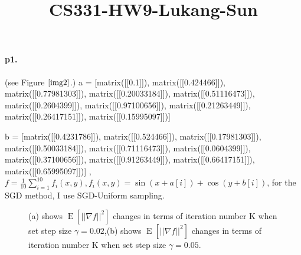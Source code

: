 \documentclass[12pt,a4paper]{article}
\title{CS331-HW9-Lukang-Sun}
\DeclareMathOperator{\E}{\mathrm{E}}
\begin{document}
	\maketitle
	\paragraph{p1.}
	(see Figure $\ref{img2}$.)
	a = [matrix([[0.1]]), matrix([[0.424466]]), matrix([[0.77981303]]), matrix([[0.20033184]]), matrix([[0.51116473]]), matrix([[0.2604399]]), matrix([[0.97100656]]), matrix([[0.21263449]]), matrix([[0.26417151]]), matrix([[0.15995097]])]
	
	b = [matrix([[0.4231786]]), matrix([[0.524466]]), matrix([[0.17981303]]), matrix([[0.50033184]]), matrix([[0.71116473]]), matrix([[0.0604399]]), matrix([[0.37100656]]), matrix([[0.91263449]]), matrix([[0.66417151]]), matrix([[0.65995097]])]
	,$f=\frac{1}{10}\sum_{i=1}^{10}f_i(x,y),f_i(x,y)=\sin(x+a[i])+\cos(y+b[i])$, for the SGD method, I use SGD-Uniform sampling.
		\begin{figure}
		\centering
		
		
		\caption{ (a) shows $\E\left[||\nabla f||^2\right]$ changes in terms of iteration number K when set step size $\gamma = 0.02$,(b)  shows $\E\left[||\nabla f||^2\right]$ changes in terms of iteration number K when set step size $\gamma = 0.05$.} %
		\label{img2}
	\end{figure}
\end{document}

